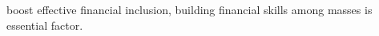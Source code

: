 \documentclass[12pt,a4paper]{article}
\begin{document}
boost effective financial inclusion, building financial skills among masses is essential factor.  




\end{document}
